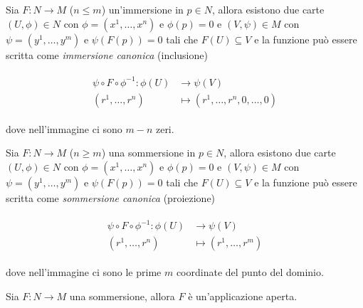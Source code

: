 \begin{theorem}\label{loc-imm}
	Sia $ F : N \to M $ ($ n \leqslant m $) un'immersione in $ p \in N $, allora esistono due carte $ (U,\phi) \in N $ con $ \phi = (x^{1},\dots,x^{n}) $ e $ \phi(p)=0 $ e $ (V,\psi) \in M $ con $ \psi = (y^{1},\dots,y^{m}) $ e $ \psi(F(p))=0 $ tali che $ F(U) \subseteq V $ e la funzione può essere scritta come \textit{immersione canonica} (inclusione)
	
	\begin{align}
		\begin{split}
			\psi \circ F \circ \phi^{-1} : \phi(U) &\to \psi(V)\\
			(r^{1},\dots,r^{n}) &\mapsto (r^{1},\dots,r^{n},0,\dots,0)
		\end{split}
	\end{align}

	dove nell'immagine ci sono $ m-n $ zeri.
\end{theorem}

\begin{theorem}\label{loc-sub}
	Sia $ F : N \to M $ ($ n \geqslant m $) una sommersione in $ p \in N $, allora esistono due carte $ (U,\phi) \in N $ con $ \phi = (x^{1},\dots,x^{n}) $ e $ \phi(p)=0 $ e $ (V,\psi) \in M $ con $ \psi = (y^{1},\dots,y^{m}) $ e $ \psi(F(p))=0 $ tali che $ F(U) \subseteq V $ e la funzione può essere scritta come \textit{sommersione canonica} (proiezione)
	
	\begin{align}
		\begin{split}
			\psi \circ F \circ \phi^{-1} : \phi(U) &\to \psi(V)\\
			(r^{1},\dots,r^{n}) &\mapsto (r^{1},\dots,r^{m})
		\end{split}
	\end{align}
	
	dove nell'immagine ci sono le prime $ m $ coordinate del punto del dominio.
\end{theorem}

\begin{corollary}[1]
	Sia $ F : N \to M $ una sommersione, allora $ F $ è un'applicazione aperta.
\end{corollary}

